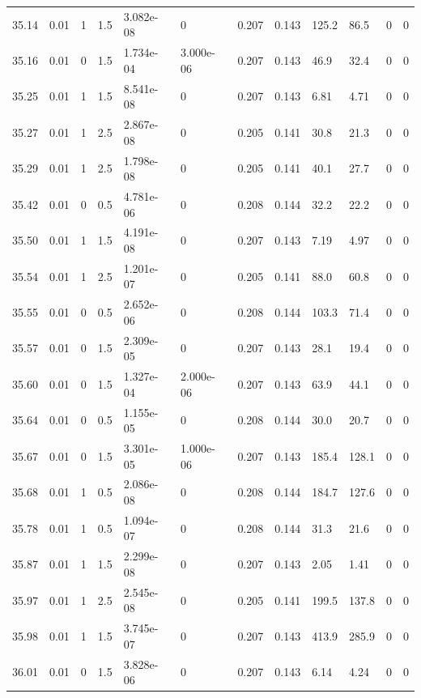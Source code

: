 \documentclass[preview]{standalone}
\begin{document}
{{{{{{{{{{{\begin{tabular}{L{1.2cm}C{1.2cm} C{0.3cm}C{0.5cm} C{1.4cm}C{1.4cm} C{1.4cm}C{1.4cm} C{1.6cm}C{1.6cm} C{1.6cm}C{1.6cm}}
  35.14  &  0.01  & 1     & 1.5 &  3.082e-08  & 0  &  0.207&   0.143& 125.2 & 86.5   &  0 & 0  \\ 
  35.16  &  0.01  & 0     & 1.5 &  1.734e-04  & 3.000e-06  &  0.207&   0.143& 46.9 & 32.4   &  0 & 0  \\ 
  35.25  &  0.01  & 1     & 1.5 &  8.541e-08  & 0  &  0.207&   0.143& 6.81 & 4.71   &  0 & 0  \\ 
  35.27  &  0.01  & 1     & 2.5 &  2.867e-08  & 0  &  0.205&   0.141& 30.8 & 21.3   &  0 & 0  \\ 
  35.29  &  0.01  & 1     & 2.5 &  1.798e-08  & 0  &  0.205&   0.141& 40.1 & 27.7   &  0 & 0  \\ 
  35.42  &  0.01  & 0     & 0.5 &  4.781e-06  & 0  &  0.208&   0.144& 32.2 & 22.2   &  0 & 0  \\ 
  35.50  &  0.01  & 1     & 1.5 &  4.191e-08  & 0  &  0.207&   0.143& 7.19 & 4.97   &  0 & 0  \\ 
  35.54  &  0.01  & 1     & 2.5 &  1.201e-07  & 0  &  0.205&   0.141& 88.0 & 60.8   &  0 & 0  \\ 
  35.55  &  0.01  & 0     & 0.5 &  2.652e-06  & 0  &  0.208&   0.144& 103.3 & 71.4   &  0 & 0  \\ 
  35.57  &  0.01  & 0     & 1.5 &  2.309e-05  & 0  &  0.207&   0.143& 28.1 & 19.4   &  0 & 0  \\ 
  35.60  &  0.01  & 0     & 1.5 &  1.327e-04  & 2.000e-06  &  0.207&   0.143& 63.9 & 44.1   &  0 & 0  \\ 
  35.64  &  0.01  & 0     & 0.5 &  1.155e-05  & 0  &  0.208&   0.144& 30.0 & 20.7   &  0 & 0  \\ 
  35.67  &  0.01  & 0     & 1.5 &  3.301e-05  & 1.000e-06  &  0.207&   0.143& 185.4 & 128.1   &  0 & 0  \\ 
  35.68  &  0.01  & 1     & 0.5 &  2.086e-08  & 0  &  0.208&   0.144& 184.7 & 127.6   &  0 & 0  \\ 
  35.78  &  0.01  & 1     & 0.5 &  1.094e-07  & 0  &  0.208&   0.144& 31.3 & 21.6   &  0 & 0  \\ 
  35.87  &  0.01  & 1     & 1.5 &  2.299e-08  & 0  &  0.207&   0.143& 2.05 & 1.41   &  0 & 0  \\ 
  35.97  &  0.01  & 1     & 2.5 &  2.545e-08  & 0  &  0.205&   0.141& 199.5 & 137.8   &  0 & 0  \\ 
  35.98  &  0.01  & 1     & 1.5 &  3.745e-07  & 0  &  0.207&   0.143& 413.9 & 285.9   &  0 & 0  \\ 
  36.01  &  0.01  & 0     & 1.5 &  3.828e-06  & 0  &  0.207&   0.143& 6.14 & 4.24   &  0 & 0  \\ 

\end{tabular}}}}}}}}}}}}
\end{document}

